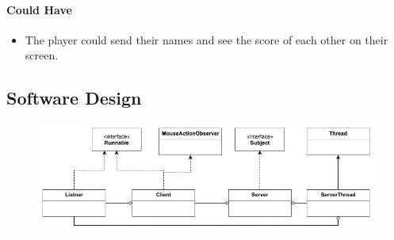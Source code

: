 \documentclass{article}
\begin{document}
\paragraph{Could Have}
\begin{itemize}
	\item The player could send their names and see the score of each other on their screen.
\end{itemize}
 

\subsection{Software Design}
\begin{figure}[H]
\includegraphics[scale=0.55]{Images/MultiplayerClassDiagram.jpeg}
\end{figure}
\end{document}
